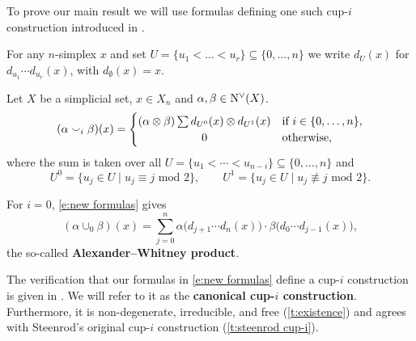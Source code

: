 To prove our main result we will use formulas defining one such \mbox{cup-$i$} construction introduced in \cite{medina2021fast_sq}.

\begin{notation*}
	For any $n$-simplex $x$ and set $U = \{u_1 < \dots < u_r\} \subseteq \big\{ 0, \dots, n \big\}$ we write $d_U(x)$ for $d_{u_1}\! \dotsm d_{u_r}(x)$, with $d_{\emptyset}(x) = x$.
\end{notation*}

\begin{definition} \label{d:my cup-i}
	Let $X$ be a simplicial set, $x \in X_n$ and $\alpha, \beta \in \operatorname{N^{\vee}}(X)$.
	\begin{equation} \label{e:new formulas}
	(\alpha \cup_i \beta)(x) =
	\begin{cases}
	(\alpha \ot \beta) \sum d_{U^0}(x) \ot d_{U^1}(x) &
	\text{if } i \in \{0, \dots, n\}, \\
	\hfil 0 &
	\text{otherwise},
	\end{cases}
	\end{equation}
	where the sum is taken over all $U = \{u_1 < \cdots < u_{n-i}\} \subseteq \{0, \dots, n\}$ and
	\begin{equation*}
	U^0 = \{u_j \in U \mid u_j \equiv j \text{ mod } 2\}, \qquad
	U^1 = \{u_j \in U \mid u_j \not\equiv j \text{ mod } 2\}.
	\end{equation*}
\end{definition}

\begin{example}
	For $i = 0$, \cref{e:new formulas} gives
	\begin{equation*}
	(\alpha \cup_0 \beta)(x) =
	\sum_{j=0}^n \alpha \big(d_{j+1} \cdots d_{n}(x)\big) \cdot \beta \big(d_{0} \cdots d_{j-1}(x)\big),
	\end{equation*}
	the so-called \textbf{Alexander--Whitney product}.
\end{example}

The verification that our formulas in \cref{e:new formulas} define a \mbox{cup-$i$} construction is given in \cite{medina2021fast_sq}.
We will refer to it as the \textbf{canonical \mbox{cup-$i$} construction}.
Furthermore, it is non-degenerate, irreducible, and free (\cref{t:existence}) and agrees with Steenrod's original cup-$i$ construction (\cref{t:steenrod cup-i}).